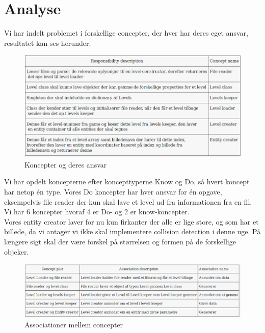 \section{Analyse}
Vi har indelt problemet i forskellige concepter, der hver har deres eget ansvar, resultatet kan ses herunder.
\begin{figure}
  \includegraphics[width=15cm]{latex/ResponsibilityDescription}
  \caption{Koncepter og deres ansvar}
\end{figure}
Vi har opdelt koncepterne efter koncepttyperne Know og Do, så hvert koncept har netop én type. Vores Do koncepter har hver ansvar for én opgave, eksempelvis file reader der kun skal lave et level ud fra informationen fra en fil. Vi har 6 koncepter hvoraf 4 er Do- og 2 er know-koncepter.\\
Vores entity creator laver for nu kun firkanter der alle er lige store, og som har et billede, da vi antager vi ikke skal implementere collision detection i denne uge. På længere sigt skal der være forskel på størrelsen og formen på de forskellige objeker.

\begin{figure}
  \includegraphics[width=15cm]{latex/ConceptPairs}
  \caption{Associationer mellem concepter}
\end{figure}

